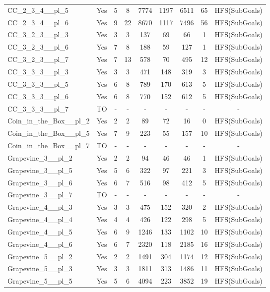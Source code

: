 \documentclass{article}
\begin{document}
\begin{tabular}{lcccccccc}
CC\_2\_3\_4\_\_pl\_5 & Yes & 5 & 8 & 7774 & 1197 & 6511 & 65 & HFS(SubGoals) \\
CC\_2\_3\_4\_\_pl\_6 & Yes & 9 & 22 & 8670 & 1117 & 7496 & 56 & HFS(SubGoals) \\
CC\_3\_2\_3\_\_pl\_3 & Yes & 3 & 3 & 137 & 69 & 66 & 1 & HFS(SubGoals) \\
CC\_3\_2\_3\_\_pl\_6 & Yes & 7 & 8 & 188 & 59 & 127 & 1 & HFS(SubGoals) \\
CC\_3\_2\_3\_\_pl\_7 & Yes & 7 & 13 & 578 & 70 & 495 & 12 & HFS(SubGoals) \\
CC\_3\_3\_3\_\_pl\_3 & Yes & 3 & 3 & 471 & 148 & 319 & 3 & HFS(SubGoals) \\
CC\_3\_3\_3\_\_pl\_5 & Yes & 6 & 8 & 789 & 170 & 613 & 5 & HFS(SubGoals) \\
CC\_3\_3\_3\_\_pl\_6 & Yes & 6 & 8 & 770 & 152 & 612 & 5 & HFS(SubGoals) \\
CC\_3\_3\_3\_\_pl\_7 & TO & - & - & - & - & - & - & - \\
Coin\_in\_the\_Box\_\_pl\_2 & Yes & 2 & 2 & 89 & 72 & 16 & 0 & HFS(SubGoals) \\
Coin\_in\_the\_Box\_\_pl\_5 & Yes & 7 & 9 & 223 & 55 & 157 & 10 & HFS(SubGoals) \\
Coin\_in\_the\_Box\_\_pl\_7 & TO & - & - & - & - & - & - & - \\
Grapevine\_3\_\_pl\_2 & Yes & 2 & 2 & 94 & 46 & 46 & 1 & HFS(SubGoals) \\
Grapevine\_3\_\_pl\_5 & Yes & 5 & 6 & 322 & 97 & 221 & 3 & HFS(SubGoals) \\
Grapevine\_3\_\_pl\_6 & Yes & 6 & 7 & 516 & 98 & 412 & 5 & HFS(SubGoals) \\
Grapevine\_3\_\_pl\_7 & TO & - & - & - & - & - & - & - \\
Grapevine\_4\_\_pl\_3 & Yes & 3 & 3 & 475 & 152 & 320 & 2 & HFS(SubGoals) \\
Grapevine\_4\_\_pl\_4 & Yes & 4 & 4 & 426 & 122 & 298 & 5 & HFS(SubGoals) \\
Grapevine\_4\_\_pl\_5 & Yes & 6 & 9 & 1246 & 133 & 1102 & 10 & HFS(SubGoals) \\
Grapevine\_4\_\_pl\_6 & Yes & 6 & 7 & 2320 & 118 & 2185 & 16 & HFS(SubGoals) \\
Grapevine\_5\_\_pl\_2 & Yes & 2 & 2 & 1491 & 304 & 1174 & 12 & HFS(SubGoals) \\
Grapevine\_5\_\_pl\_3 & Yes & 3 & 3 & 1811 & 313 & 1486 & 11 & HFS(SubGoals) \\
Grapevine\_5\_\_pl\_5 & Yes & 5 & 6 & 4094 & 223 & 3852 & 19 & HFS(SubGoals) \\

\end{tabular}
\end{document}
